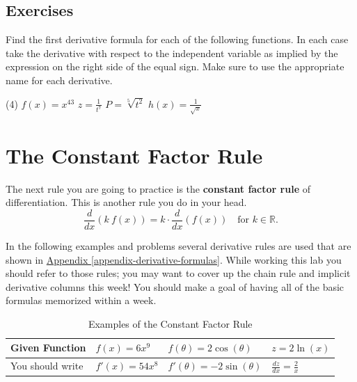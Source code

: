 \documentclass[12pt,]{book}
\newcommand{\terminology}[1]{\textbf{#1}}
\theoremstyle{plain}
\theoremstyle{definition}
\numberwithin{equation}{section}
\newcommand{\reals}{\mathbb{R}}
\newcommand{\fe}[2]{#1\mathopen{}\left(#2\right)\mathclose{}}
\newcommand{\fd}[1]{#1'}
\newcommand{\lz}[2]{\frac{d#1}{d#2}}
\newcommand{\lzoo}[2]{{\frac{d}{d#1}}{\left(#2\right)}}
\begin{document}
\subsection[Exercises]{Exercises}\label{exercises-33}
Find the first derivative formula for each of the following functions.  In each case take the derivative with respect to the independent variable as implied by the expression on the right side of the equal sign.  Make sure to use the appropriate name for each derivative.%
\par
\begin{exercisegroup}(4)
\exercise[1.]\hypertarget{exercise-353}{\null}\(\fe{f}{x}=x^{43}\)%
\exercise[2.]\hypertarget{exercise-354}{\null}\(z=\frac{1}{t^{7}}\)%
\exercise[3.]\hypertarget{exercise-355}{\null}\(P=\sqrt[5]{t^2}\)%
\exercise[4.]\hypertarget{exercise-356}{\null}\(\fe{h}{x}=\frac{1}{\sqrt{x}}\)%
\end{exercisegroup}
\par\smallskip\noindent
\typeout{************************************************}
\typeout{************************************************}
\section[The Constant Factor Rule]{The Constant Factor Rule}\label{section-constant-factor-rule}
The next rule you are going to practice is the \terminology{constant factor rule} of differentiation.  This is another rule you do in your head. \begin{equation}\lzoo{x}{k\ \fe{f}{x}}=k\cdot\lzoo{x}{\fe{f}{x}}\quad\text{for }k\in\reals\text{.}\label{men-3}\end{equation}%
\par
In the following examples and problems several derivative rules are used that are shown in \hyperref[appendix-derivative-formulas]{Appendix \ref{appendix-derivative-formulas}}.  While working this lab you should refer to those rules; you may want to cover up the chain rule and implicit derivative columns this week!  You should make a goal of having all of the basic formulas memorized within a week.%
\begin{table}
\centering
\caption{Examples of the Constant Factor Rule\label{table-constant-factor-rule}}
\begin{tabular}{l|l|l|l}
\toprule
Given Function&\(\fe{f}{x}=6x^9\)&\(\fe{f}{\theta}=2\fe{\cos}{\theta}\)&\(z=2\fe{\ln}{x}\)\\
\midrule
You should write&\(\fe{\fd{f}}{x}=54x^8\)&\(\fe{\fd{f}}{\theta}=-2\fe{\sin}{\theta}\)&\(\lz{z}{x}=\frac{2}{x}\)\\
\bottomrule
\end{tabular}
\end{table}
\typeout{************************************************}
\typeout{************************************************}
\end{document}
